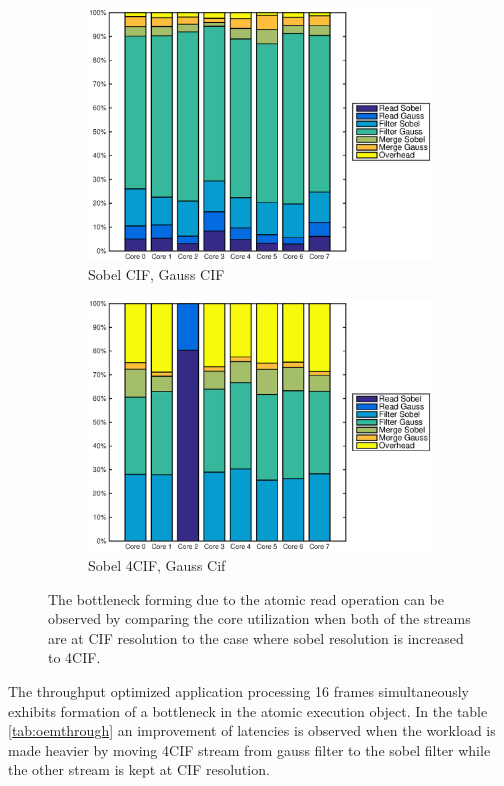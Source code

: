 \begin{figure}
    \centering
    \begin{subfigure}[t]{0.49\textwidth}
        \centering
        \includegraphics[width=0.99\linewidth]{images/openem_cifcif_8cores_eo.eps}
        \caption{Sobel CIF, Gauss CIF}
        \label{fig:oem8coreeo}
    \end{subfigure}
    \begin{subfigure}[t]{0.49\textwidth}
        \centering
        \includegraphics[width=0.99\linewidth]{images/openem_sobel4cif_gausscif_eo.eps}
        \caption{Sobel 4CIF, Gauss Cif}
        \label{fig:oem8coreeosobel4cif}
    \end{subfigure}
    \caption{The bottleneck forming due to the atomic read operation can be observed by comparing the core utilization when both of the streams are at CIF resolution to the case where sobel resolution is increased to 4CIF.}
\end{figure}
The throughput optimized application processing 16 frames simultaneously exhibits formation of a bottleneck in the atomic execution object. In the table \ref{tab:oemthrough} an improvement of latencies is observed when the workload is made heavier by moving 4CIF stream from gauss filter to the sobel filter while the other stream is kept at CIF resolution.

